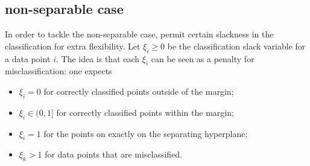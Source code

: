 \documentclass[a4paper]{article}
\begin{document}
\subsection*{non-separable case} %
\label{sub:non_separable_case}

In order to tackle the non-separable case, permit certain slackness in the classification
for extra flexibility. Let $\xi_i \geq 0$ be the classification slack variable for a data
point $i$. The idea is that each $\xi_i$ can be seen as a penalty for misclassification:
one expects \begin{itemize}
	\item $\xi_i = 0$ for correctly classified points outside of the margin;
	\item $\xi_i\in(0,1]$ for correctly classified points within the margin;
	\item $\xi_i = 1$ for the points on exactly on the separating hyperplane;
	\item $\xi_k > 1$ for data points that are misclassified.
\end{itemize}
\end{document}
